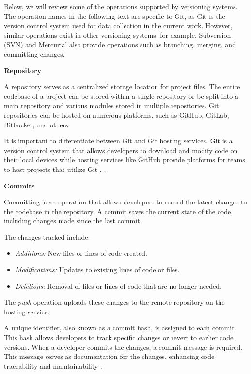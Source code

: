 Below, we will review some of the operations supported by versioning systems. The operation names in the following text are specific to Git, as Git is the version control system used for data collection in the current work. However, similar operations exist in other versioning systems; for example, Subversion (SVN) and Mercurial also provide operations such as branching, merging, and committing changes.

\textbf{Repository}

A repository serves as a centralized storage location for project files. The entire codebase of a project can be stored within a single repository or be split into a main repository and various modules stored in multiple repositories. Git repositories can be hosted on numerous platforms, such as GitHub, GitLab, Bitbucket, and others.

It is important to differentiate between Git and Git hosting services. Git is a version control system that allows developers to download and modify code on their local devices while hosting services like GitHub provide platforms for teams to host projects that utilize Git \cite{git}, \cite{github}.

\textbf{Commits}

Committing is an operation that allows developers to record the latest changes to the codebase in the repository. A commit saves the current state of the code, including changes made since the last commit.

The changes tracked include:

\begin{itemize}
\item \textit{Additions:} New files or lines of code created.
\item \textit{Modifications:} Updates to existing lines of code or files.
\item \textit{Deletions:} Removal of files or lines of code that are no longer needed.
\end{itemize}

The \textit{push} operation uploads these changes to the remote repository on the hosting service.

A unique identifier, also known as a commit hash, is assigned to each commit. This hash allows developers to track specific changes or revert to earlier code versions. When a developer commits the changes, a commit message is required. This message serves as documentation for the changes, enhancing code traceability and maintainability \cite{git}.

